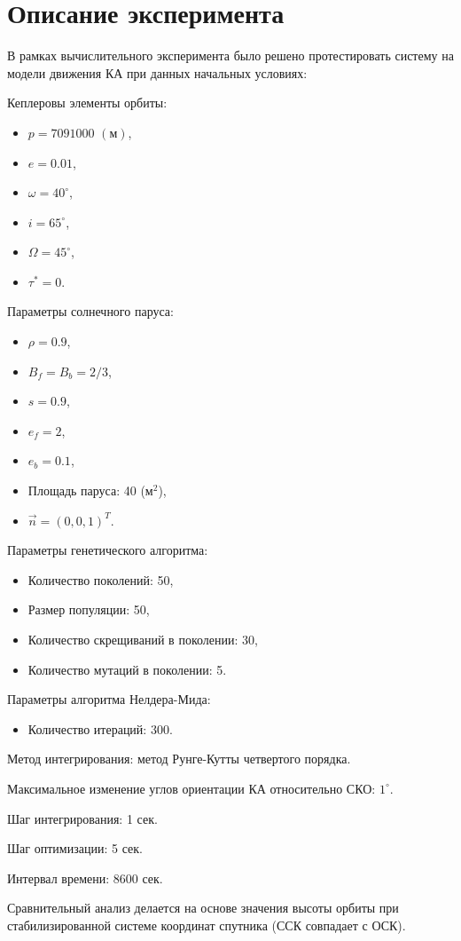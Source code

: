 \section{Описание эксперимента}
\noindent\indent В рамках вычислительного эксперимента было решено протестировать
систему на модели движения КА при данных начальных условиях:\par
\noindent Кеплеровы элементы орбиты:
\begin{itemize}
    \item $p = 7091000$ $(\text{м})$,
    \item $e = 0.01$,
    \item $\omega = 40^\circ$,
    \item $i = 65^\circ$,
    \item $\Omega = 45^\circ$,
    \item $\tau^* = 0$.
\end{itemize}
    Параметры солнечного паруса:
\begin{itemize}
    \item $\rho = 0.9$,
    \item $B_f = B_b = 2/3$,
    \item $s = 0.9$,
    \item $e_f = 2$,
    \item $e_b = 0.1$,
    \item Площадь паруса: 40 ($\text{м}^2$),
    \item $\vec{n} = (0, 0, 1)^T$.
\end{itemize}
Параметры генетического алгоритма:
\begin{itemize}
    \item Количество поколений: 50,
    \item Размер популяции: 50,
    \item Количество скрещиваний в поколении: 30,
    \item Количество мутаций в поколении: 5.
\end{itemize}
Параметры алгоритма Нелдера-Мида:
\begin{itemize}
    \item Количество итераций: $300$.
\end{itemize}\par
\noindent Метод интегрирования: метод Рунге-Кутты четвертого порядка.\par
\noindent Максимальное изменение углов ориентации КА относительно СКО: $1^\circ$.\par
\noindent Шаг интегрирования: 1 сек.\par
\noindent Шаг оптимизации: 5 сек.\par
\noindent Интервал времени: 8600 сек.\par
\noindent Сравнительный анализ делается на основе значения высоты орбиты при
стабилизированной системе координат спутника (ССК совпадает с ОСК).
